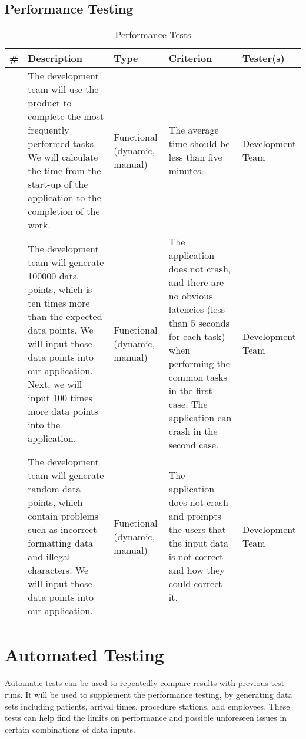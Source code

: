 \documentclass[12pt]{article}
\newcounter{TestCounter}
\begin{document}
\subsection{Performance Testing}
\begin{center}
	\begin{longtable}{c>{\raggedright\arraybackslash}p{4.8cm} >{\raggedright\arraybackslash}p{3.5cm}>{\raggedright\arraybackslash}p{3cm}>{\raggedright\arraybackslash}p{3cm}}
		\caption{Performance Tests}\label{Performance Tests}\\
		\toprule
		\bf \# & \bf Description & \bf Type & \bf Criterion & Tester(s) \\\midrule
		\stepcounter{TestCounter}\arabic{TestCounter} 
		& The development team will use the product to complete the most frequently performed tasks.
		We will calculate the time from the start-up of the application to the completion of the work.
		& Functional (dynamic, manual)	
		& The average time should be less than five minutes.  
		& 	Development Team
		\\\midrule
		\stepcounter{TestCounter}\arabic{TestCounter} 
		& The development team will generate 100000 data points, which is ten times more
		than the expected data points. We will input those data points into our
		application. Next, we will input 100 times more data points into the application.
		& Functional (dynamic, manual)	
		& The application does not crash, and there are no obvious latencies
		(less than 5 seconds for each task) when performing
		the common tasks in the first case. The application can crash in the second case.  
		& 	Development Team
		\\\midrule
		\stepcounter{TestCounter}\arabic{TestCounter} 
		& The development team will generate random data points, which contain problems such as
		incorrect formatting data and illegal characters. We will input those data points into
		our application.
		& Functional (dynamic, manual)	
		& The application does not crash and prompts the users that the input data is not
		correct and how they could correct it.  
		& 	Development Team
		\\\midrule
		\bottomrule
	\end{longtable}
\end{center}

\section{Automated Testing}
Automatic tests can be used to repeatedly compare results with previous test runs. It will be used to supplement the performance testing, by generating data sets including patients, arrival times, procedure stations, and employees. These tests can help find the limits on performance and possible unforeseen issues in certain combinations of data inputs.
\end{document}

